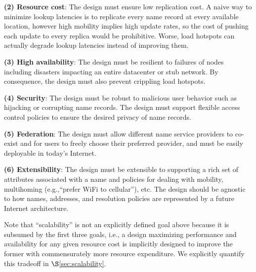 {\bf (2) Resource cost}: The design must ensure low replication cost. A naive way to minimize lookup latencies is to replicate every name record at every available location, however high mobility implies high update rates, so the cost of pushing each update to every replica would be prohibitive. Worse, load hotspots can actually degrade lookup latencies  instead of improving them.

{\bf (3) High availability}: The design must be resilient to failures of nodes including disasters impacting an entire datacenter or stub network. By consequence, the design must also prevent crippling load hotspots.


{\bf (4) Security}: The design must be robust to malicious user behavior such as hijacking or corrupting name records. The design must support flexible access control policies to ensure the desired privacy of name records.

{\bf (5) Federation}: The design must allow different name service providers to co-exist and for users to freely choose their preferred provider, and must be easily deployable in today's Internet.

{\bf (6) Extensibility}: The design must be extensible to supporting a rich set of attributes associated with a name and policies for dealing with mobility, multihoming (e.g.,``prefer WiFi to cellular''), etc. The design should be agnostic to how names, addresses, and resolution policies are represented by a future Internet architecture.

Note that ``scalability'' is not an explicitly defined goal above because it is subsumed by the first three goals, i.e., a design maximizing performance and availability for any given resource cost is implicitly designed to improve the former with commensurately more resource expenditure. We explicitly quantify this tradeoff in $\S$\ref{sec:scalability}.





